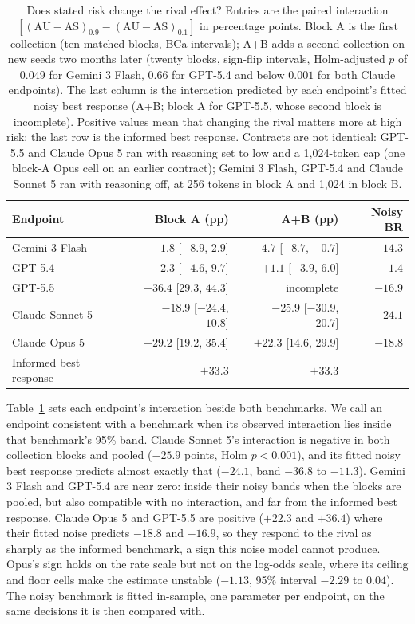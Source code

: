 \documentclass{article}
\begin{document}
\begin{table}[t]
\caption{Does stated risk change the rival effect? Entries are the paired
interaction $[(\mathrm{AU}-\mathrm{AS})_{0.9}-(\mathrm{AU}-\mathrm{AS})_{0.1}]$
in percentage points. Block A is the first collection (ten matched blocks, BCa
intervals); A+B adds a second collection on new seeds two months later (twenty
blocks, sign-flip intervals, Holm-adjusted $p$ of $0.049$ for Gemini 3 Flash,
$0.66$ for GPT-5.4 and below $0.001$ for both Claude endpoints). The last column is the interaction predicted by each endpoint's fitted noisy
best response (A+B; block A for GPT-5.5, whose second block is incomplete). Positive values mean that changing the rival
matters more at high risk; the last row is the informed best response. Contracts are not identical: GPT-5.5 and Claude Opus 5 ran with reasoning set
to low and a 1{,}024-token cap (one block-A Opus cell on an earlier contract);
Gemini 3 Flash, GPT-5.4 and Claude Sonnet 5 ran with reasoning off, at 256
tokens in block A and 1{,}024 in block B.}
\label{tab:rival-risk-interaction}
\centering
\scriptsize
\setlength{\tabcolsep}{3pt}
\setlength{\tabcolsep}{2pt}
\begin{tabular}{@{}lrrr@{}}
\toprule
Endpoint & Block A (pp) & A+B (pp) & Noisy BR \\
\midrule
Gemini 3 Flash  & $-1.8$ [$-8.9$, $2.9$] & $-4.7$ [$-8.7$, $-0.7$] & $-14.3$ \\
GPT-5.4         & $+2.3$ [$-4.6$, $9.7$] & $+1.1$ [$-3.9$, $6.0$] & $-1.4$ \\
GPT-5.5         & $+36.4$ [$29.3$, $44.3$] & incomplete & $-16.9$ \\
Claude Sonnet 5 & $-18.9$ [$-24.4$, $-10.8$] & $-25.9$ [$-30.9$, $-20.7$] & $-24.1$ \\
Claude Opus 5   & $+29.2$ [$19.2$, $35.4$] & $+22.3$ [$14.6$, $29.9$] & $-18.8$ \\
\midrule
Informed best response & $+33.3$ & $+33.3$ & \\
\bottomrule
\end{tabular}
\end{table}

Table~\ref{tab:rival-risk-interaction} sets each endpoint's interaction beside
both benchmarks. We call an endpoint consistent with a benchmark when its
observed interaction lies inside that benchmark's 95\% band. Claude Sonnet 5's
interaction is negative in both collection blocks and pooled ($-25.9$ points,
Holm $p<0.001$), and its fitted noisy best response predicts almost exactly that
($-24.1$, band $-36.8$ to $-11.3$). Gemini 3 Flash and GPT-5.4 are near zero:
inside their noisy bands when the blocks are pooled, but also compatible with no
interaction, and far from the informed best response. Claude Opus 5 and GPT-5.5
are positive ($+22.3$ and $+36.4$) where their fitted noise predicts $-18.8$ and
$-16.9$, so they respond to the rival as sharply as the informed benchmark, a
sign this noise model cannot produce. Opus's sign holds on the rate scale but
not on the log-odds scale, where its ceiling and floor cells make the estimate
unstable ($-1.13$, 95\% interval $-2.29$ to $0.04$). The noisy benchmark is
fitted in-sample, one parameter per endpoint, on the same decisions it is then
compared with.
\end{document}
